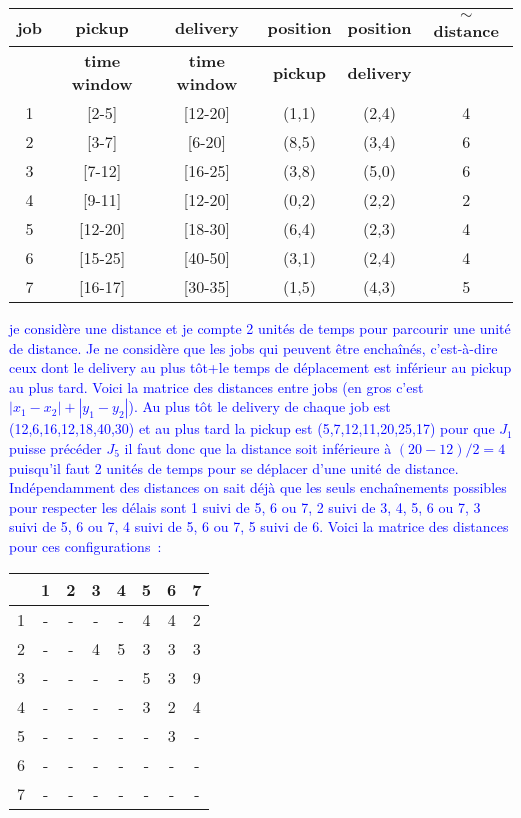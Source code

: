 \documentclass[a4paper,10pt]{article}
\begin{document}
\begin{center}
\begin{tabular}{|c|c|c|c|c|c|} \hline
{\bf job} & {\bf pickup} & {\bf delivery} & {\bf position} & {\bf position} & {\bf $\sim$ distance}\\  \hline
          & {\bf time window} & {\bf time window} & {\bf pickup} & {\bf delivery} & \\  \hline
1 & [2-5] & [12-20] & (1,1) & (2,4) & 4 \\
2 & [3-7] & [6-20] & (8,5) & (3,4) & 6 \\
3 & [7-12] & [16-25] & (3,8) & (5,0) & 6 \\
4 & [9-11] & [12-20] & (0,2) & (2,2) & 2 \\
5 & [12-20] & [18-30] & (6,4) & (2,3) & 4 \\
6 & [15-25] & [40-50] & (3,1) & (2,4) & 4 \\
7 & [16-17] & [30-35] & (1,5) & (4,3) & 5 \\ \hline
\end{tabular}
\end{center}

\vspace{0.3cm}

\textcolor{blue}{je considère une distance et je compte 2 unités de temps pour parcourir une unité de distance. Je ne considère que les jobs qui peuvent être enchaînés, c'est-à-dire ceux dont le delivery au plus tôt+le temps de déplacement est inférieur au pickup au plus tard. Voici la matrice des distances entre jobs (en gros c'est $|x_1-x_2| + |y_1 - y_2|$). Au plus tôt le delivery de chaque job est (12,6,16,12,18,40,30) et au plus tard la pickup est (5,7,12,11,20,25,17) pour que $J_1$ puisse précéder $J_5$ il faut donc que la distance soit inférieure à $(20-12)/2 = 4$ puisqu'il faut 2 unités de temps pour se déplacer d'une unité de distance. Indépendamment des distances on sait déjà que les seuls enchaînements possibles pour respecter les délais sont 1 suivi de 5, 6 ou 7, 2 suivi de 3, 4, 5, 6 ou 7, 3 suivi de 5, 6 ou 7, 4 suivi de 5, 6 ou 7, 5 suivi de 6. Voici la matrice des distances pour ces configurations~:}


\begin{tabular}{c|ccccccc|} \hline
  & 1 & 2 & 3 & 4 & 5 & 6 & 7 \\ \hline
1 & - & - & - & - & 4 & 4 & 2 \\
2 & - & - & 4 & 5 & 3 & 3 & 3 \\
3 & - & - & - & - & 5 & 3 & 9 \\
4 & - & - & - & - & 3 & 2 & 4 \\
5 & - & - & - & - & - & 3 & - \\
6 & - & - & - & - & - & - & - \\
7 & - & - & - & - & - & - & - \\ \hline
\end{tabular}
\end{document}
